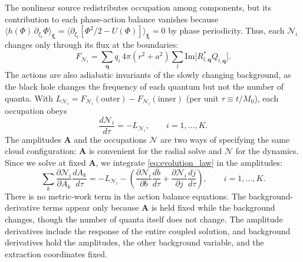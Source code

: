 \documentclass[11pt]{article}
\begin{document}
The nonlinear source redistributes occupation among components, but its contribution to each phase-action balance vanishes because \(\langle h(\Phi)\,\partial_{\xi_i}\Phi\rangle_{\boldsymbol\xi}=\langle\partial_{\xi_i}[\Phi^2/2-U(\Phi)]\rangle_{\boldsymbol\xi}=0\) by phase periodicity. Thus, each \(\mathcal N_i\) changes only through its flux at the boundaries:
\begin{equation}
    F_{\mathcal{N}_i}=\sum_\mathbf{q} q_i\,4\pi(r^2+a^2)\sum_{l}\mathrm{Im}\big[R^*_{l,\mathbf{q}}Q_{l,\mathbf{q}}\big].
\end{equation}
The actions are also adiabatic invariants of the slowly changing background, as the black hole changes the frequency of each quantum but not the number of quanta. With $L_{\mathcal{N}_i}=F_{\mathcal{N}_i}(\text{outer})-F_{\mathcal{N}_i}(\text{inner})$ (per unit $\tau \equiv t/M_0$), each occupation obeys
\begin{equation}
    \label{eq:evolution_law}
    \frac{d\mathcal{N}_i}{d\tau} = -L_{\mathcal{N}_i}, \qquad i=1,\ldots,K.
\end{equation}
The amplitudes $\mathbf{A}$ and the occupations $\boldsymbol{\mathcal{N}}$ are two ways of specifying the same cloud configuration: $\mathbf{A}$ is convenient for the radial solve and $\boldsymbol{\mathcal{N}}$ for the dynamics. Since we solve at fixed $\mathbf{A}$, we integrate \eqref{eq:evolution_law} in the amplitudes:
\begin{equation}
    \label{eq:action_balance}
    \sum_{k}\frac{\partial\mathcal{N}_i}{\partial A_k}\frac{dA_k}{d\tau} = -L_{\mathcal{N}_i} - \left(\frac{\partial\mathcal{N}_i}{\partial b}\frac{db}{d\tau} + \frac{\partial\mathcal{N}_i}{\partial j}\frac{dj}{d\tau}\right), \qquad i=1,\ldots,K.
\end{equation}
There is no metric-work term in the action balance equations. The background-derivative terms appear only because $\mathbf{A}$ is held fixed while the background changes, though the number of quanta itself does not change. The amplitude derivatives include the response of the entire coupled solution, and background derivatives hold the amplitudes, the other background variable, and the extraction coordinates fixed. 
\end{document}
